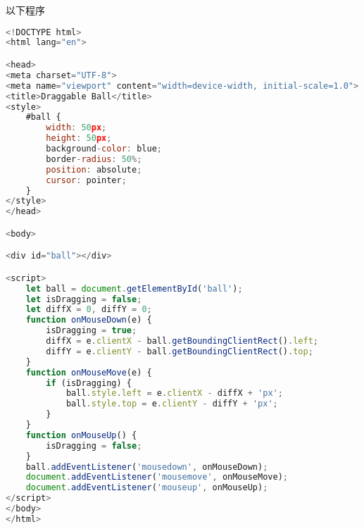 
以下程序

\begin{lstlisting}[language=js,caption=ball.html]
<!DOCTYPE html>
<html lang="en">

<head>
<meta charset="UTF-8">
<meta name="viewport" content="width=device-width, initial-scale=1.0">
<title>Draggable Ball</title>
<style>
	#ball {
		width: 50px;
		height: 50px;
		background-color: blue;
		border-radius: 50%;
		position: absolute;
		cursor: pointer;
	}
</style>
</head>

<body>

<div id="ball"></div>

<script>
	let ball = document.getElementById('ball');
	let isDragging = false;
	let diffX = 0, diffY = 0;
	function onMouseDown(e) {
		isDragging = true;
		diffX = e.clientX - ball.getBoundingClientRect().left;
		diffY = e.clientY - ball.getBoundingClientRect().top;	
	}
	function onMouseMove(e) {
		if (isDragging) {
			ball.style.left = e.clientX - diffX + 'px';
			ball.style.top = e.clientY - diffY + 'px';
		}
	}
	function onMouseUp() {
		isDragging = false;
	}
	ball.addEventListener('mousedown', onMouseDown);
	document.addEventListener('mousemove', onMouseMove);
	document.addEventListener('mouseup', onMouseUp);
</script>
</body>
</html>
\end{lstlisting}
